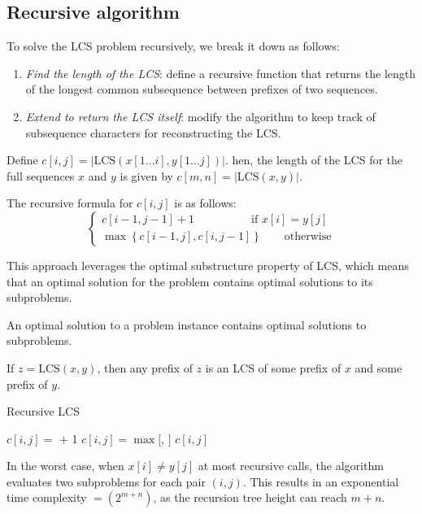 \subsection{Recursive algorithm}
To solve the LCS problem recursively, we break it down as follows:
\begin{enumerate}
    \item \textit{Find the length of the LCS}: define a recursive function that returns the length of the longest common subsequence between prefixes of two sequences.
    \item \textit{Extend to return the LCS itself}: modify the algorithm to keep track of subsequence characters for reconstructing the LCS.
\end{enumerate}
Define $c[i, j] = |\text{LCS}(x[1 \dots i], y[1 \dots j])|$.
hen, the length of the LCS for the full sequences $x$ and $y$ is given by $c[m,n]=|\text{LCS}(x, y)|.$

\begin{theorem}
    The recursive formula for $c[i,j]$ is as follows: 
    \[\begin{cases}
        c[i-1, j-1] + 1 \qquad\qquad\quad \text{if }x[i] = y[j] \\
        \max\left\{c[i-1, j], c[i, j-1]\right\} \qquad \text{otherwise}
    \end{cases}\]
\end{theorem}
This approach leverages the optimal substructure property of LCS, which means that an optimal solution for the problem contains optimal solutions to its subproblems.
\begin{definition}
    An optimal solution to a problem instance contains optimal solutions to subproblems.
\end{definition}
If $z = \text{LCS}(x, y)$, then any prefix of $z$ is an LCS of some prefix of $x$ and some prefix of $y$.
\begin{algorithm}[H]
    \caption{Recursive LCS}
    \begin{algorithmic}
                \State $c[i,j]=$  $+$ 1
            \Else 
                \State $c[i,j]=\max[$, $]$
            \EndIf 
            \State \Return $c[i,j]$
        \EndFunction
    \end{algorithmic}
\end{algorithm}  
In the worst case, when $x[i] \neq y[j]$ at most recursive calls, the algorithm evaluates two subproblems for each pair $(i,j)$. 
This results in an exponential time complexity $\mathcal{=}(2^{m+n})$, as the recursion tree height can reach $m+n$.

